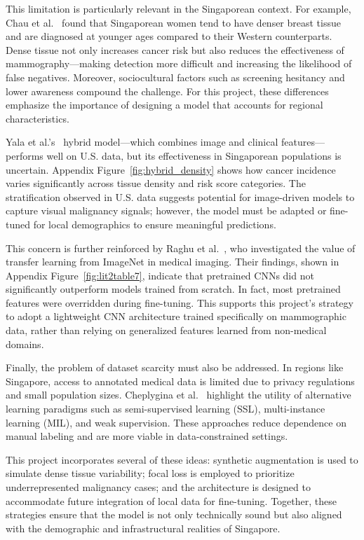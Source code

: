 \documentclass[12pt]{article}
\begin{document}
This limitation is particularly relevant in the Singaporean context. For example, Chau et al.~\cite{6} found that Singaporean women tend to have denser breast tissue and are diagnosed at younger ages compared to their Western counterparts. Dense tissue not only increases cancer risk but also reduces the effectiveness of mammography—making detection more difficult and increasing the likelihood of false negatives. Moreover, sociocultural factors such as screening hesitancy and lower awareness compound the challenge. For this project, these differences emphasize the importance of designing a model that accounts for regional characteristics.

Yala et al.’s~\cite{1} hybrid model—which combines image and clinical features—performs well on U.S. data, but its effectiveness in Singaporean populations is uncertain. Appendix Figure~\ref{fig:hybrid_density} shows how cancer incidence varies significantly across tissue density and risk score categories. The stratification observed in U.S. data suggests potential for image-driven models to capture visual malignancy signals; however, the model must be adapted or fine-tuned for local demographics to ensure meaningful predictions.

This concern is further reinforced by Raghu et al.~\cite{2}, who investigated the value of transfer learning from ImageNet in medical imaging. Their findings, shown in Appendix Figure~\ref{fig:lit2table7}, indicate that pretrained CNNs did not significantly outperform models trained from scratch. In fact, most pretrained features were overridden during fine-tuning. This supports this project’s strategy to adopt a lightweight CNN architecture trained specifically on mammographic data, rather than relying on generalized features learned from non-medical domains.

Finally, the problem of dataset scarcity must also be addressed. In regions like Singapore, access to annotated medical data is limited due to privacy regulations and small population sizes. Cheplygina et al.~\cite{4} highlight the utility of alternative learning paradigms such as semi-supervised learning (SSL), multi-instance learning (MIL), and weak supervision. These approaches reduce dependence on manual labeling and are more viable in data-constrained settings.

This project incorporates several of these ideas: synthetic augmentation is used to simulate dense tissue variability; focal loss is employed to prioritize underrepresented malignancy cases; and the architecture is designed to accommodate future integration of local data for fine-tuning. Together, these strategies ensure that the model is not only technically sound but also aligned with the demographic and infrastructural realities of Singapore.
\end{document}
